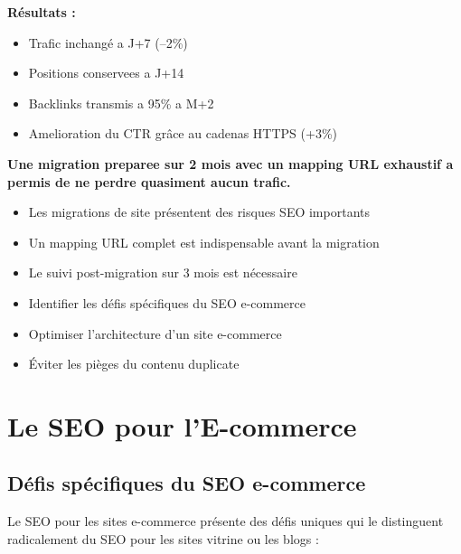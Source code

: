 \documentclass[12pt,a4paper,twoside]{report}
\newcommand{\important}[1]{\textbf{\textcolor{googlered}{#1}}}
\newcommand{\level}[1]{\medskip\bigskip}
\begin{document}
\textbf{Résultats :}
\begin{itemize}
    \item Trafic inchangé a J+7 (--2\%)
    \item Positions conservees a J+14
    \item Backlinks transmis a 95\% a M+2
    \item Amelioration du CTR grâce au cadenas HTTPS (+3\%)
\end{itemize}

\important{Une migration preparee sur 2 mois avec un mapping URL exhaustif a permis de ne perdre quasiment aucun trafic.}


\begin{takeaways}
\begin{itemize}
    \item Les migrations de site présentent des risques SEO importants
    \item Un mapping URL complet est indispensable avant la migration
    \item Le suivi post-migration sur 3 mois est nécessaire
\end{itemize}
\end{takeaways}

\level{2}
\begin{objectives}
\begin{itemize}
    \item Identifier les défis spécifiques du SEO e-commerce
    \item Optimiser l'architecture d'un site e-commerce
    \item Éviter les pièges du contenu duplicate
\end{itemize}
\end{objectives}

\chapter{Le SEO pour l'E-commerce}
\label{ch:ecommerce}

\section{Défis spécifiques du SEO e-commerce}

Le SEO pour les sites e-commerce présente des défis uniques qui le distinguent radicalement du SEO pour les sites vitrine ou les blogs :
\end{document}
